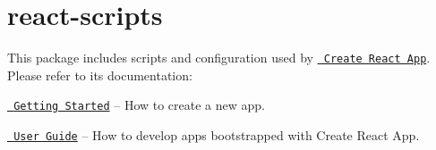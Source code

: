 \chapter{react-\/scripts}
\hypertarget{md_pkiclassroomrescheduler_2src_2main_2frontend_2node__modules_2react-scripts_2_r_e_a_d_m_e}{}\label{md_pkiclassroomrescheduler_2src_2main_2frontend_2node__modules_2react-scripts_2_r_e_a_d_m_e}
\label{md_pkiclassroomrescheduler_2src_2main_2frontend_2node__modules_2react-scripts_2_r_e_a_d_m_e_autotoc_md20374}%
%
 This package includes scripts and configuration used by \href{https://github.com/facebook/create-react-app}{\texttt{ Create React App}}.~\newline
 Please refer to its documentation\+:


\begin{DoxyItemize}
\item \href{https://facebook.github.io/create-react-app/docs/getting-started}{\texttt{ Getting Started}} – How to create a new app.
\item \href{https://facebook.github.io/create-react-app/}{\texttt{ User Guide}} – How to develop apps bootstrapped with Create React App. 
\end{DoxyItemize}